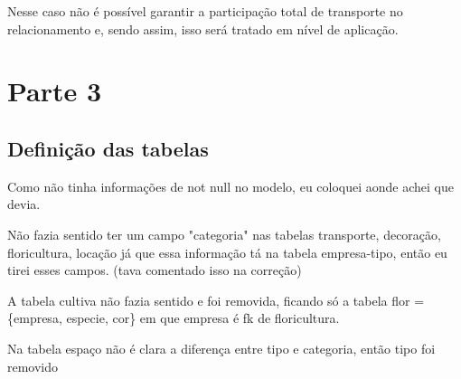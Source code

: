 \documentclass[12pt,a4paper]{article}
\begin{document}
Nesse caso não é possível garantir a participação total de transporte no relacionamento e, sendo assim, isso será tratado em nível de aplicação.


\section{Parte 3}

\subsection{Definição das tabelas}
Como não tinha informações de not null no modelo, eu coloquei aonde achei que devia.

Não fazia sentido ter um campo "categoria" nas tabelas transporte, decoração, floricultura, locação já que essa informação tá na tabela empresa-tipo, então eu tirei esses campos. (tava comentado isso na correção)

A tabela cultiva não fazia sentido e foi removida, ficando só a tabela flor = \{empresa, especie, cor\} em que empresa é fk de floricultura.

Na tabela espaço não é clara a diferença entre tipo e categoria, então tipo foi removido
\end{document}
